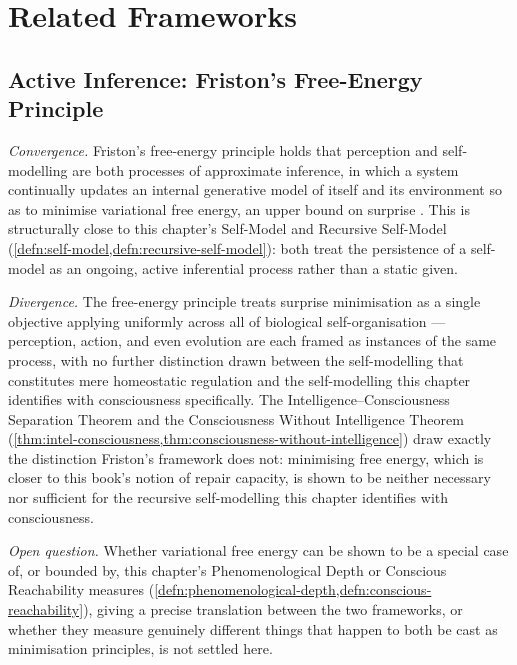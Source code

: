 \documentclass[12pt,twoside,openright]{book}
\begin{document}
\section{Related Frameworks}
\label{sec:ch21-related-frameworks}

\subsection*{Active Inference: Friston's Free-Energy Principle}

\emph{Convergence.} Friston's free-energy principle holds that
perception and self-modelling are both processes of approximate
inference, in which a system continually updates an internal
generative model of itself and its environment so as to minimise
variational free energy, an upper bound on surprise
\parencite{friston2010}. This is structurally close to this
chapter's Self-Model and Recursive Self-Model
(\cref{defn:self-model,defn:recursive-self-model}): both treat
the persistence of a self-model as an ongoing, active inferential
process rather than a static given.

\emph{Divergence.} The free-energy principle treats surprise
minimisation as a single objective applying uniformly across all
of biological self-organisation --- perception, action, and even
evolution are each framed as instances of the same process, with
no further distinction drawn between the self-modelling that
constitutes mere homeostatic regulation and the self-modelling
this chapter identifies with consciousness specifically. The
Intelligence--Consciousness Separation Theorem and the
Consciousness Without Intelligence Theorem
(\cref{thm:intel-consciousness,thm:consciousness-without-intelligence})
draw exactly the distinction Friston's framework does not:
minimising free energy, which is closer to this book's notion of
repair capacity, is shown to be neither necessary nor sufficient
for the recursive self-modelling this chapter identifies with
consciousness.

\emph{Open question.} Whether variational free energy can be
shown to be a special case of, or bounded by, this chapter's
Phenomenological Depth or Conscious Reachability measures
(\cref{defn:phenomenological-depth,defn:conscious-reachability}),
giving a precise translation between the two frameworks, or
whether they measure genuinely different things that happen to
both be cast as minimisation principles, is not settled here.
\end{document}
